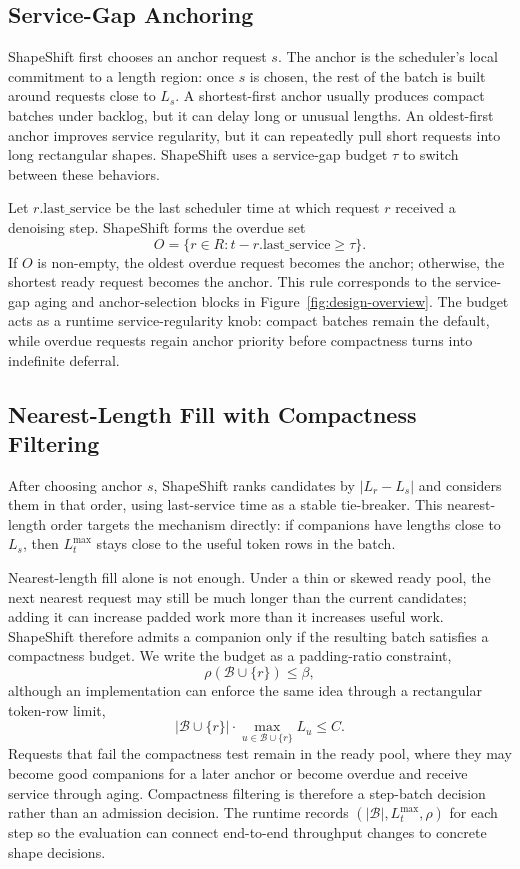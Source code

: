 \documentclass[letterpaper]{article} \usepackage[submission]{aaai2027} \usepackage[hyphens]{url} \usepackage{graphicx} \usepackage{subcaption} \urlstyle{rm} \def\UrlFont{\rm} \usepackage{natbib} \usepackage{amsmath} \usepackage{amssymb} \usepackage{booktabs} \usepackage{multirow} \usepackage{algorithm} \usepackage{algorithmic}
\begin{document}
\subsection{Service-Gap Anchoring}

ShapeShift first chooses an anchor request $s$. The anchor is the scheduler's local commitment to a length region: once $s$ is chosen, the rest of the batch is built around requests close to $L_s$. A shortest-first anchor usually produces compact batches under backlog, but it can delay long or unusual lengths. An oldest-first anchor improves service regularity, but it can repeatedly pull short requests into long rectangular shapes. ShapeShift uses a service-gap budget $\tau$ to switch between these behaviors.

Let $r.\mathrm{last\_service}$ be the last scheduler time at which request $r$ received a denoising step. ShapeShift forms the overdue set
\[
  O=\{r\in R: t-r.\mathrm{last\_service}\ge \tau\}.
\]
If $O$ is non-empty, the oldest overdue request becomes the anchor; otherwise, the shortest ready request becomes the anchor. This rule corresponds to the service-gap aging and anchor-selection blocks in Figure~\ref{fig:design-overview}. The budget acts as a runtime service-regularity knob: compact batches remain the default, while overdue requests regain anchor priority before compactness turns into indefinite deferral.

\subsection{Nearest-Length Fill with Compactness Filtering}

After choosing anchor $s$, ShapeShift ranks candidates by $|L_r-L_s|$ and considers them in that order, using last-service time as a stable tie-breaker. This nearest-length order targets the mechanism directly: if companions have lengths close to $L_s$, then $L_t^{\max}$ stays close to the useful token rows in the batch.

Nearest-length fill alone is not enough. Under a thin or skewed ready pool, the next nearest request may still be much longer than the current candidates; adding it can increase padded work more than it increases useful work. ShapeShift therefore admits a companion only if the resulting batch satisfies a compactness budget. We write the budget as a padding-ratio constraint,
\[
  \rho(\mathcal{B}\cup\{r\}) \le \beta,
\]
although an implementation can enforce the same idea through a rectangular token-row limit,
\[
  |\mathcal{B}\cup\{r\}|\cdot \max_{u\in\mathcal{B}\cup\{r\}} L_u \le C.
\]
Requests that fail the compactness test remain in the ready pool, where they may become good companions for a later anchor or become overdue and receive service through aging. Compactness filtering is therefore a step-batch decision rather than an admission decision. The runtime records $(|\mathcal{B}|,L_t^{\max},\rho)$ for each step so the evaluation can connect end-to-end throughput changes to concrete shape decisions.
\end{document}
